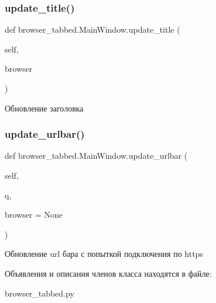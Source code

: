 \subsubsection{\texorpdfstring{update\_title()}{update\_title()}}
{\footnotesize\ttfamily def browser\+\_\+tabbed.\+Main\+Window.\+update\+\_\+title (\begin{DoxyParamCaption}\item[{}]{self,  }\item[{}]{browser }\end{DoxyParamCaption})}

\begin{DoxyVerb}Обновление заголовка\end{DoxyVerb}
 \mbox{\label{classbrowser__tabbed_1_1MainWindow_a685eb00ce77d2eb76ec7cbe7f69b8e51}} 
\subsubsection{\texorpdfstring{update\_urlbar()}{update\_urlbar()}}
{\footnotesize\ttfamily def browser\+\_\+tabbed.\+Main\+Window.\+update\+\_\+urlbar (\begin{DoxyParamCaption}\item[{}]{self,  }\item[{}]{q,  }\item[{}]{browser = {\ttfamily None} }\end{DoxyParamCaption})}

\begin{DoxyVerb}Обновление url бара с попыткой подключения по https\end{DoxyVerb}
 

Объявления и описания членов класса находятся в файле\+:\begin{DoxyCompactItemize}
\item 
browser\+\_\+tabbed.\+py\end{DoxyCompactItemize}

